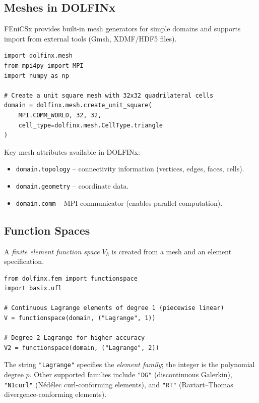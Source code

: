 \documentclass[11pt]{article}
\begin{document}
\subsection{Meshes in DOLFINx}

FEniCSx provides built-in mesh generators for simple domains and supports
import from external tools (Gmsh, XDMF/HDF5 files).

\begin{lstlisting}[style=python, caption={Creating a unit-square mesh in FEniCSx.}]
import dolfinx.mesh
from mpi4py import MPI
import numpy as np

# Create a unit square mesh with 32x32 quadrilateral cells
domain = dolfinx.mesh.create_unit_square(
    MPI.COMM_WORLD, 32, 32,
    cell_type=dolfinx.mesh.CellType.triangle
)
\end{lstlisting}

Key mesh attributes available in DOLFINx:
\begin{itemize}
  \item \texttt{domain.topology} -- connectivity information (vertices, edges, faces, cells).
  \item \texttt{domain.geometry} -- coordinate data.
  \item \texttt{domain.comm} -- MPI communicator (enables parallel computation).
\end{itemize}

\subsection{Function Spaces}

A \emph{finite element function space} $V_h$ is created from a mesh and an
element specification.

\begin{lstlisting}[style=python, caption={Creating a Lagrange function space.}]
from dolfinx.fem import functionspace
import basix.ufl

# Continuous Lagrange elements of degree 1 (piecewise linear)
V = functionspace(domain, ("Lagrange", 1))

# Degree-2 Lagrange for higher accuracy
V2 = functionspace(domain, ("Lagrange", 2))
\end{lstlisting}

The string \texttt{"Lagrange"} specifies the \emph{element family};
the integer is the polynomial degree $p$.
Other supported families include \texttt{"DG"} (discontinuous Galerkin),
\texttt{"N1curl"} (N\'{e}d\'{e}lec curl-conforming elements),
and \texttt{"RT"} (Raviart--Thomas divergence-conforming elements).
\end{document}
